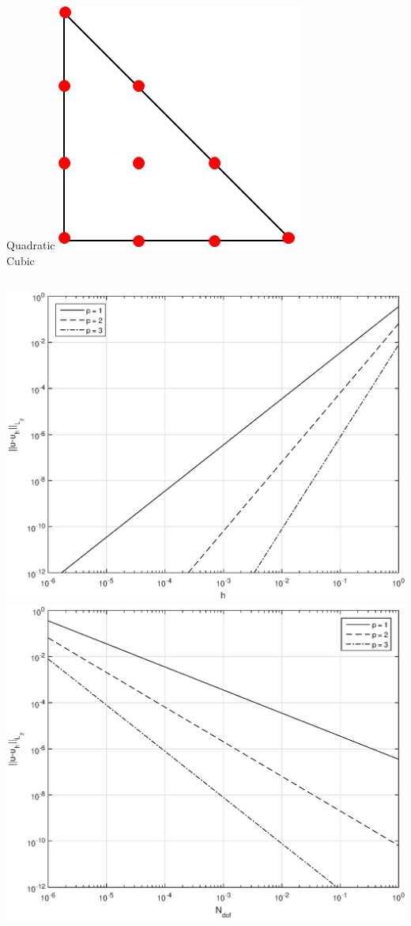 \documentclass[compress,10pt]{beamer}
\begin{document}
\begin{frame}[t]
{\begin{columns}
Quadratic
\centering
{}\includegraphics[width=0.75\columnwidth]{images/ref_tri_dofs_k3.png} \\
Cubic
\end{columns}
}
{
{}\includegraphics[width=0.45\columnwidth]{images/hConverge.eps} \hspace*{1mm}
{}\includegraphics[width=0.45\columnwidth]{images/NConverge.eps}
}
\end{frame}
\end{document}
